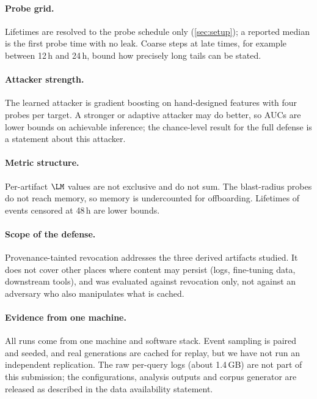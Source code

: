 \paragraph{Probe grid.}
Lifetimes are resolved to the probe schedule only (\cref{sec:setup}); a reported median is the first probe time with no leak. Coarse steps at late times, for example between 12\,h and 24\,h, bound how precisely long tails can be stated.

\paragraph{Attacker strength.}
The learned attacker is gradient boosting on hand-designed features with four probes per target. A stronger or adaptive attacker may do better, so AUCs are lower bounds on achievable inference; the chance-level result for the full defense is a statement about this attacker.

\paragraph{Metric structure.}
Per-artifact $\LM$ values are not exclusive and do not sum. The blast-radius probes do not reach memory, so memory is undercounted for offboarding. Lifetimes of events censored at 48\,h are lower bounds.

\paragraph{Scope of the defense.}
Provenance-tainted revocation addresses the three derived artifacts studied. It does not cover other places where content may persist (logs, fine-tuning data, downstream tools), and was evaluated against revocation only, not against an adversary who also manipulates what is cached.

\paragraph{Evidence from one machine.}
All runs come from one machine and software stack. Event sampling is paired and seeded, and real generations are cached for replay, but we have not run an independent replication. The raw per-query logs (about 1.4\,GB) are not part of this submission; the configurations, analysis outputs and corpus generator are released as described in the data availability statement.
